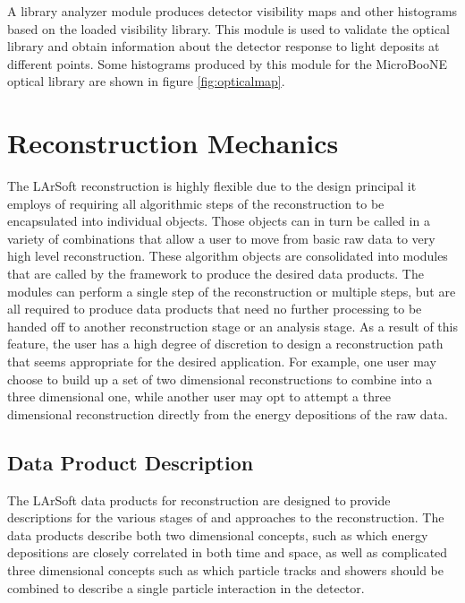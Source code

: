 \documentclass[12pt]{elsarticle}
\newcommand{\larsoft}{LArSoft }
\begin{document}
A library analyzer module produces detector visibility maps and other histograms based on the loaded visibility library.  This module is used to validate the optical library and obtain information about the detector response to light deposits at different points.  Some histograms produced by this module for the MicroBooNE optical library are shown in figure \ref{fig:opticalmap}.


\section{Reconstruction Mechanics}

The \larsoft reconstruction is highly flexible due to the design principal it employs of requiring all algorithmic steps of the reconstruction to be encapsulated into individual objects.  Those objects can in turn be called in a variety of combinations that allow a user to move from basic raw data to very high level reconstruction.  These algorithm objects are consolidated into modules that are called by the framework to produce the desired data products.  The modules can perform a single step of the reconstruction or multiple steps, but are all required to produce data products that need no further processing to be handed off to another reconstruction stage or an analysis stage.  As a result of this feature, the user has a high degree of discretion to design a reconstruction path that seems appropriate for the desired application.  For example, one user may choose to build up a set of two dimensional reconstructions to combine into a three dimensional one, while another user may opt to attempt a three dimensional reconstruction directly from the energy depositions of the raw data.  

\subsection{Data Product Description}

The \larsoft data products for reconstruction are designed to provide descriptions for the various stages of and approaches to the reconstruction.  The data products describe both two dimensional concepts, such as which energy depositions are closely correlated in both time and space, as well as complicated three dimensional concepts such as which particle tracks and showers should be combined to describe a single particle interaction in the detector.
\end{document}
